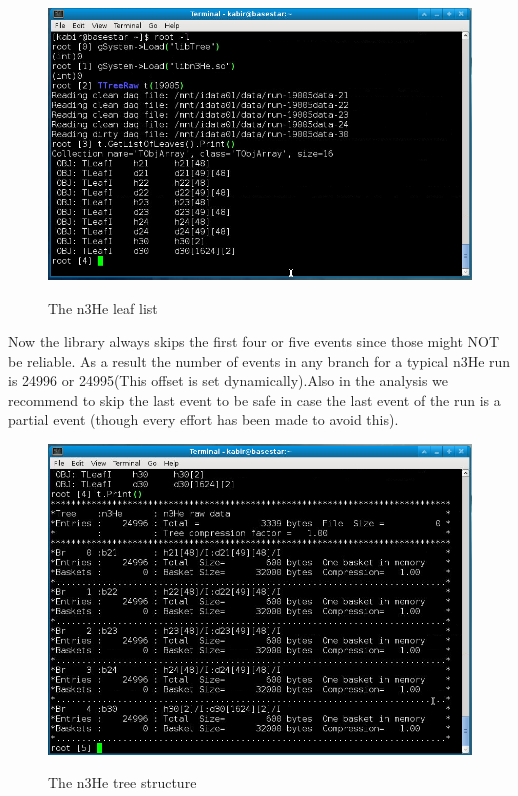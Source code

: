 \documentclass[12pt]{article}
\begin{document}
\begin{figure}[htb]
\centering
\includegraphics[width=6in]{treeStructure1.png}\\
\caption{The n3He leaf list}\label{f3}
\end{figure}

Now the library always skips the first four or five events since those might NOT be reliable. As a result the number of events in any branch for a typical n3He run is 24996 or 24995(This offset is set dynamically).Also in the analysis we recommend to skip the last event to be safe in case the last event of the run is a partial event (though every effort has been made to avoid this).


\begin{figure}[htb]
\centering
\includegraphics[width=6in]{treeStructure2.png}\\
\caption{The n3He tree structure}\label{f4}
\end{figure}
\end{document}
